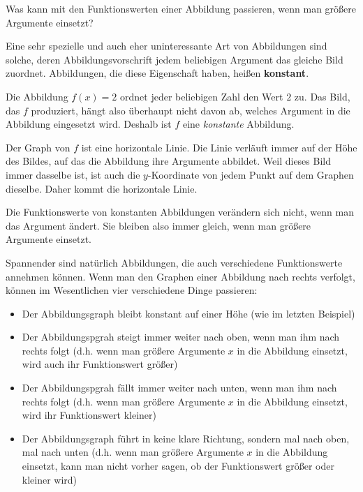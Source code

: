 \documentclass[../../main.tex]{subfiles}
\begin{document}
\label{sec:abbildungen_monotonie}

Was kann mit den Funktionswerten einer Abbildung passieren, wenn man größere Argumente einsetzt?

Eine sehr spezielle und auch eher uninteressante Art von Abbildungen sind solche, deren Abbildungsvorschrift jedem beliebigen Argument das gleiche Bild zuordnet. Abbildungen, die diese Eigenschaft haben, heißen \textbf{konstant}.

\begin{example}{}
    
    Die Abbildung $f(x)=2$ ordnet jeder beliebigen Zahl den Wert $2$ zu. Das Bild, das $f$ produziert, hängt also überhaupt nicht davon ab, welches Argument in die Abbildung eingesetzt wird. Deshalb ist $f$ eine \emph{konstante} Abbildung.
    
    Der Graph von $f$ ist eine horizontale Linie. Die Linie verläuft immer auf der Höhe des Bildes, auf das die Abbildung ihre Argumente abbildet. Weil dieses Bild immer dasselbe ist, ist auch die $y$-Koordinate von jedem Punkt auf dem Graphen dieselbe. Daher kommt die horizontale Linie.
\end{example}

Die Funktionswerte von konstanten Abbildungen verändern sich nicht, wenn man das Argument ändert. Sie bleiben also immer gleich, wenn man größere Argumente einsetzt.

Spannender sind natürlich Abbildungen, die auch verschiedene Funktionswerte annehmen können. Wenn man den Graphen einer Abbildung nach rechts verfolgt, können im Wesentlichen vier verschiedene Dinge passieren:
\begin{itemize}
    \item Der Abbildungsgraph bleibt konstant auf einer Höhe (wie im letzten Beispiel)
    \item Der Abbildungspgrah steigt immer weiter nach oben, wenn man ihm nach rechts folgt (d.h. wenn man größere Argumente $x$ in die Abbildung einsetzt, wird auch ihr Funktionswert größer)
    \item Der Abbildungspgrah fällt immer weiter nach unten, wenn man ihm nach rechts folgt (d.h. wenn man größere Argumente $x$ in die Abbildung einsetzt, wird ihr Funktionswert kleiner)
    \item Der Abbildungsgraph führt in keine klare Richtung, sondern mal nach oben, mal nach unten (d.h. wenn man größere Argumente $x$ in die Abbildung einsetzt, kann man nicht vorher sagen, ob der Funktionswert größer oder kleiner wird)
\end{itemize}
\end{document}
